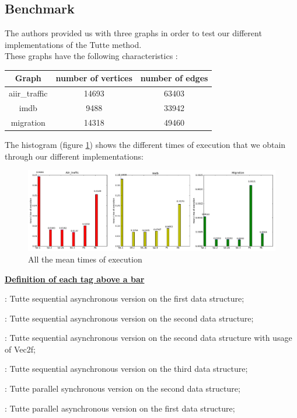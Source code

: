 \subsection{Benchmark}

The authors provided us with three graphs in order to test our
different implementations of the Tutte method.\\

These graphs have the following characteristics :

\begin{center}
\begin{tabular}{|c|c|c|}
\hline
Graph & number of vertices & number of edges \\
\hline
aiir\_traffic & 14693 & 63403\\
imdb & 9488 & 33942\\
migration & 14318 & 49460\\
\hline
\end{tabular}
\end{center}


The histogram (figure \ref{histo}) shows the different times of execution
that we obtain through our different implementations:

\begin{figure}[!h]
  \centering
  \includegraphics[scale=0.39]{img/histogramme.png}
  \caption{All the mean times of execution}
  \label{histo}
\end{figure}

\underline{\bf Definition of each tag above a bar}
\begin{dinglist}{70}
\item [SA 1]: Tutte sequential asynchronous version on the first data structure;
\item [SA 2]: Tutte sequential asynchronous version on the second data structure;
\item [SA 2b]: Tutte sequential asynchronous version on the second data structure with usage of Vec2f;
\item [SA 3]: Tutte sequential asynchronous version on the third data structure;
\item [PS]: Tutte parallel synchronous version on the second data structure;
\item [PA]: Tutte parallel asynchronous version on the first data structure;
\end{dinglist}

